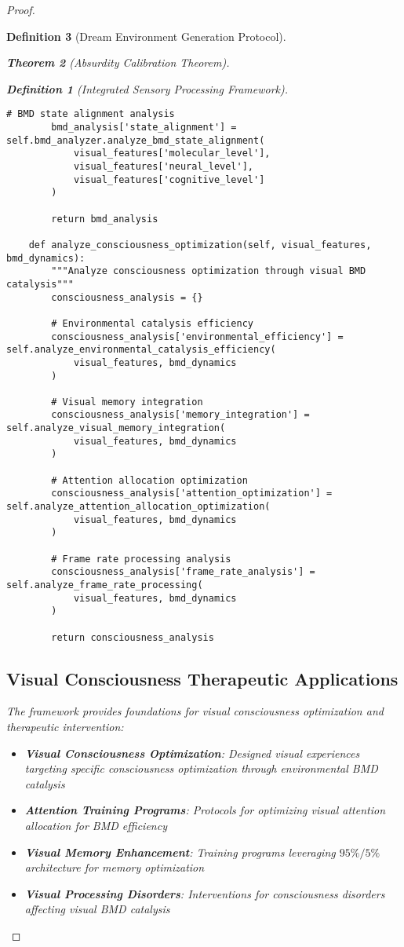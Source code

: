 \documentclass[12pt,a4paper]{article}
\newtheorem{theorem}{Theorem}[section]
\newtheorem{definition}[theorem]{Definition}
\begin{document}
\begin{proof}
\begin{definition}[Dream Environment Generation Protocol]
\begin{theorem}[Absurdity Calibration Theorem]
\begin{observation}
\begin{definition}[Integrated Sensory Processing Framework]
\begin{lstlisting}[style=pythonstyle, caption=Complete Visual Consciousness Analysis]
        # BMD state alignment analysis
        bmd_analysis['state_alignment'] = self.bmd_analyzer.analyze_bmd_state_alignment(
            visual_features['molecular_level'],
            visual_features['neural_level'],
            visual_features['cognitive_level']
        )
        
        return bmd_analysis
    
    def analyze_consciousness_optimization(self, visual_features, bmd_dynamics):
        """Analyze consciousness optimization through visual BMD catalysis"""
        consciousness_analysis = {}
        
        # Environmental catalysis efficiency
        consciousness_analysis['environmental_efficiency'] = self.analyze_environmental_catalysis_efficiency(
            visual_features, bmd_dynamics
        )
        
        # Visual memory integration
        consciousness_analysis['memory_integration'] = self.analyze_visual_memory_integration(
            visual_features, bmd_dynamics
        )
        
        # Attention allocation optimization
        consciousness_analysis['attention_optimization'] = self.analyze_attention_allocation_optimization(
            visual_features, bmd_dynamics
        )
        
        # Frame rate processing analysis
        consciousness_analysis['frame_rate_analysis'] = self.analyze_frame_rate_processing(
            visual_features, bmd_dynamics
        )
        
        return consciousness_analysis
\end{lstlisting}

\subsection{Visual Consciousness Therapeutic Applications}

The framework provides foundations for visual consciousness optimization and therapeutic intervention:

\begin{itemize}
\item \textbf{Visual Consciousness Optimization}: Designed visual experiences targeting specific consciousness optimization through environmental BMD catalysis
\item \textbf{Attention Training Programs}: Protocols for optimizing visual attention allocation for BMD efficiency
\item \textbf{Visual Memory Enhancement}: Training programs leveraging $95\%/5\%$ architecture for memory optimization
\item \textbf{Visual Processing Disorders}: Interventions for consciousness disorders affecting visual BMD catalysis
\end{itemize}


\end{definition}
\end{observation}
\end{theorem}
\end{definition}
\end{proof}
\end{document}
